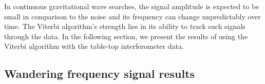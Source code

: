 \documentclass[paper-main.tex]{subfiles}
\begin{document}
In continuous gravitational wave searches, the signal amplitude is expected to be small in comparison to the noise and its frequency can change unpredictably over time.
The Viterbi algorithm's strength lies in its ability to track such signals through the data.
In the following section, we present the results of using the Viterbi algorithm with the table-top interferometer data. 








\subsection{Wandering frequency signal results}
\label{sec:wanderingResults}
\end{document}
